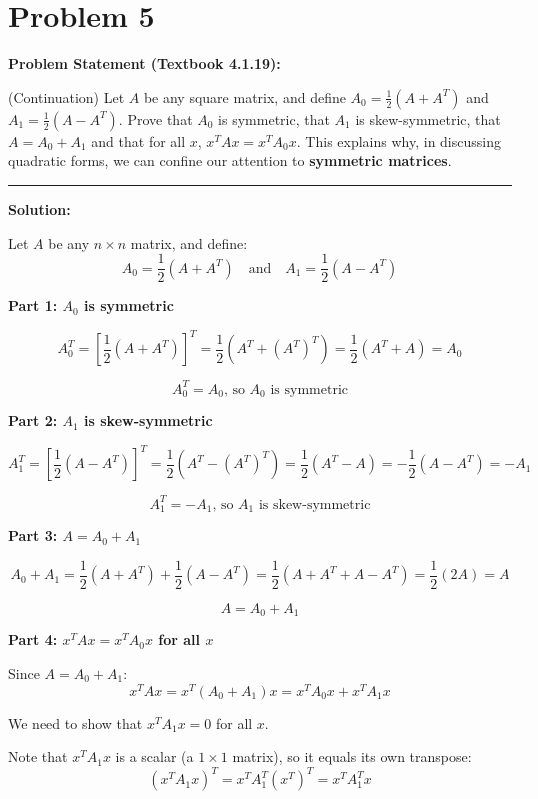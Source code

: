 \clearpage
\section*{Problem 5}

\textbf{Problem Statement (Textbook 4.1.19):} 

(Continuation) Let $A$ be any square matrix, and define $A_0 = \frac{1}{2}(A + A^T)$ and $A_1 = \frac{1}{2}(A - A^T)$. Prove that $A_0$ is symmetric, that $A_1$ is skew-symmetric, that $A = A_0 + A_1$ and that for all $x$, $x^T A x = x^T A_0 x$. This explains why, in discussing quadratic forms, we can confine our attention to \textbf{symmetric matrices}.

\noindent\rule{\textwidth}{0.4pt}

\vspace{1em}

\textbf{Solution:}

Let $A$ be any $n \times n$ matrix, and define:
$$A_0 = \frac{1}{2}(A + A^T) \quad \text{and} \quad A_1 = \frac{1}{2}(A - A^T)$$

\textbf{Part 1: $A_0$ is symmetric}

$$A_0^T = \left[\frac{1}{2}(A + A^T)\right]^T = \frac{1}{2}(A^T + (A^T)^T) = \frac{1}{2}(A^T + A) = A_0$$

$$\boxed{A_0^T = A_0 \text{, so } A_0 \text{ is symmetric}}$$

\textbf{Part 2: $A_1$ is skew-symmetric}

$$A_1^T = \left[\frac{1}{2}(A - A^T)\right]^T = \frac{1}{2}(A^T - (A^T)^T) = \frac{1}{2}(A^T - A) = -\frac{1}{2}(A - A^T) = -A_1$$

$$\boxed{A_1^T = -A_1 \text{, so } A_1 \text{ is skew-symmetric}}$$

\textbf{Part 3: $A = A_0 + A_1$}

$$A_0 + A_1 = \frac{1}{2}(A + A^T) + \frac{1}{2}(A - A^T) = \frac{1}{2}(A + A^T + A - A^T) = \frac{1}{2}(2A) = A$$

$$\boxed{A = A_0 + A_1}$$

\textbf{Part 4: $x^T A x = x^T A_0 x$ for all $x$}

Since $A = A_0 + A_1$:
$$x^T A x = x^T(A_0 + A_1)x = x^T A_0 x + x^T A_1 x$$

We need to show that $x^T A_1 x = 0$ for all $x$.

Note that $x^T A_1 x$ is a scalar (a $1 \times 1$ matrix), so it equals its own transpose:
$$(x^T A_1 x)^T = x^T A_1^T (x^T)^T = x^T A_1^T x$$


